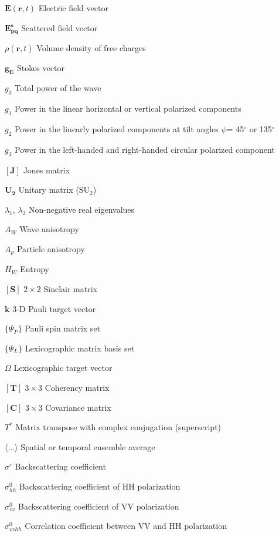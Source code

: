 \begin{symbols}
\item[$\mathbf{E}(\mathbf{r},t)$] Electric field vector
\item[$\mathbf{E_{pq}^s}$]	Scattered field vector
\item[$\rho(\mathbf{r}, t)$] Volume density of free charges
\item[$\mathbf{g}_\mathbf{E}$] Stokes vector
\item[$g_0$] Total power of the wave
\item[$g_1$] Power in the linear horizontal or vertical polarized components
\item[$g_2$] Power in the linearly polarized components at tilt angles $\psi$= 45$^\circ$ or 135$^\circ$
\item[$g_3$] Power in the left-handed and right-handed circular polarized component
\item[$\mathbf{[J]}$]	Jones matrix
\item[$\bm{U_2}$] Unitary matrix ($\mbox{SU}_2$)
\item[$\lambda_1$, $\lambda_2$]	Non-negative real eigenvalues
\item[$A_W$] Wave anisotropy 
\item[$A_{p}$] Particle anisotropy
\item[$H_W$] Entropy
\item[$\mathbf{[S]}$]	$2\times2$ Sinclair matrix
\item[$\bm{k}$] 3-D Pauli target vector
\item[$\{\Psi_P\}$]	Pauli spin matrix set
\item[$\{\Psi_L\}$]	Lexicographic matrix basis set
\item[$\bm{\varOmega}$]	Lexicographic target vector
\item[$\mathbf{[T]}$]	$3\times3$ Coherency matrix
\item[$\mathbf{[C]}$]	$3\times3$ Covariance matrix
\item[$T^{*}$]	Matrix transpose with complex conjugation (superscript)
\item[$\langle ... \rangle$]	Spatial or temporal ensemble average
\item[$\sigma$$^\circ$]	Backscattering coefficient
\item[$\sigma_{hh}^0$]	Backscattering coefficient of $\mbox{HH}$ polarization
\item[$\sigma_{vv}^0$]	Backscattering coefficient of $\mbox{VV}$ polarization
\item[$\sigma_{vvhh}^0$]	Correlation coefficient between $\mbox{VV}$ and $\mbox{HH}$ polarization
$$
\end{symbols}
